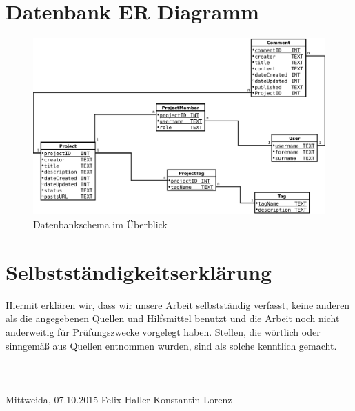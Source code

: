 \documentclass[12pt]{scrartcl}
\begin{document}
		
		\section{Datenbank ER Diagramm}	\label{sec:erdiagramm}
			\begin{landscape}
				\begin{figure}
	  				\centering
	  				\includegraphics[width=\linewidth,height=\textheight,keepaspectratio]{Bilder/db.pdf} 
	  				\caption{Datenbankschema im Überblick}
	  				\label{fig:db}
			 	\end{figure}
			\end{landscape}
		
		
		\section*{Selbstständigkeitserklärung}
			Hiermit erklären wir, dass wir unsere Arbeit selbstständig verfasst, keine anderen als die
			angegebenen Quellen und Hilfsmittel benutzt und die Arbeit noch nicht anderweitig für
			Prüfungszwecke vorgelegt haben.
			Stellen, die wörtlich oder sinngemäß aus Quellen entnommen wurden, sind als solche
			kenntlich gemacht.
			\\
			\\
			\\
			\\
			Mittweida, 07.10.2015 \hspace{7em} Felix Haller  \hspace{7em} Konstantin Lorenz
\end{document}
